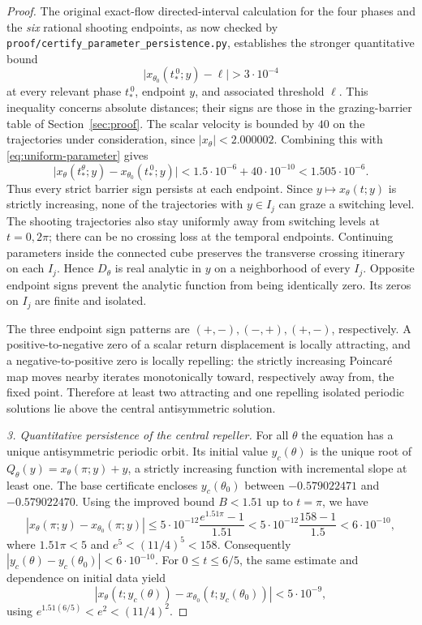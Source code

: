 \begin{proof}
The original exact-flow directed-interval calculation
for the four phases and the \emph{six} rational shooting
endpoints, as now checked by
\texttt{proof/certify\_parameter\_persistence.py},
establishes the stronger quantitative bound
\begin{equation}\label{eq:grazingmargin}
 \bigl|x_{\theta_0}(t_*^{\,0};y)-\ell\bigr|
 >3\cdot10^{-4}
\end{equation}
at every relevant phase $t_*^{\,0}$, endpoint $y$,
and associated threshold $\ell$.
This inequality concerns absolute distances; their
signs are those in the grazing-barrier table of
Section~\ref{sec:proof}.
The scalar velocity is bounded by $40$ on the
trajectories under consideration, since
$|x_\theta|<2.000002$. Combining this with
\eqref{eq:uniform-parameter} gives
\[
 \bigl|x_\theta(t_*^\theta;y)-
              x_{\theta_0}(t_*^{\,0};y)\bigr|
 <1.5\cdot10^{-6}+40\cdot10^{-10}
 <1.505\cdot10^{-6}.
\]
Thus every strict barrier sign persists at
each endpoint. Since $y\mapsto x_\theta(t;y)$
is strictly increasing, none of the trajectories
with $y\in I_j$ can graze a switching level.
The shooting trajectories also stay uniformly
away from switching levels at $t=0,2\pi$;
there can be no crossing loss at the temporal
endpoints. Continuing parameters inside the
connected cube preserves the transverse
crossing itinerary on each $I_j$. Hence
$D_\theta$ is real analytic in $y$ on a
neighborhood of every $I_j$.
Opposite endpoint signs prevent the analytic
function from being identically zero.
Its zeros on $I_j$ are finite and isolated.

The three endpoint sign patterns are
$(+,-),(-,+),(+,-)$, respectively.
A positive-to-negative zero of a scalar
return displacement is locally attracting,
and a negative-to-positive zero is locally
repelling: the strictly increasing Poincar\'e
map moves nearby iterates monotonically
toward, respectively away from, the fixed point.
Therefore at least two attracting and
one repelling isolated periodic solutions
lie above the central antisymmetric solution.

\emph{3. Quantitative persistence of the central repeller.}
For all $\theta$ the equation has a unique
antisymmetric periodic orbit. Its initial
value $y_c(\theta)$ is the unique root of
$Q_\theta(y)=x_\theta(\pi;y)+y$, a strictly
increasing function with incremental slope
at least one. The base certificate encloses
$y_c(\theta_0)$ between
$-0.579022471$ and $-0.579022470$.
Using the improved bound $B<1.51$ up to
$t=\pi$, we have
\[
 |x_\theta(\pi;y)-x_{\theta_0}(\pi;y)|
 \le5\cdot10^{-12}\frac{e^{1.51\pi}-1}{1.51}
 <5\cdot10^{-12}\frac{158-1}{1.5}
 <6\cdot10^{-10},
\]
where $1.51\pi<5$ and $e^5<(11/4)^5<158$.
Consequently
$|y_c(\theta)-y_c(\theta_0)|<6\cdot10^{-10}$.
For $0\le t\le6/5$, the same estimate and
dependence on initial data yield
\[
 |x_\theta(t;y_c(\theta))-
        x_{\theta_0}(t;y_c(\theta_0))|
 < 5\cdot10^{-9},
\]
using $e^{1.51(6/5)}<e^2<(11/4)^2$.


\end{proof}
